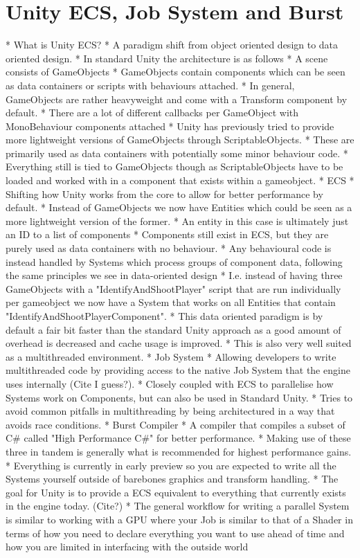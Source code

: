 \section{Unity ECS, Job System and Burst}
  * What is Unity ECS?	
	* A paradigm shift from object oriented design to data oriented design.
	* In standard Unity the architecture is as follows
		* A scene consists of GameObjects
		* GameObjects contain components which can be seen as data containers or scripts with behaviours attached.
	* In general, GameObjects are rather heavyweight and come with a Transform component by default.
		* There are a lot of different callbacks per GameObject with MonoBehaviour components attached
	* Unity has previously tried to provide more lightweight versions of GameObjects through ScriptableObjects.
		* These are primarily used as data containers with potentially some minor behaviour code.
        * Everything still is tied to GameObjects though as ScriptableObjects have to be loaded and worked with in a component that exists within a gameobject. 
    * ECS
    	* Shifting how Unity works from the core to allow for better performance by default.
    	* Instead of GameObjects we now have Entities which could be seen as a more lightweight version of the former. 
    	   * An entity in this case is ultimately just an ID to a list of components
    	* Components still exist in ECS, but they are purely used as data containers with no behaviour.
    	* Any behavioural code is instead handled by Systems which process groups of component data, following the same principles we see in data-oriented design
    		* I.e. instead of having three GameObjects with a "IdentifyAndShootPlayer" script that are run individually per gameobject we now have a System that works on all Entities that contain "IdentifyAndShootPlayerComponent".
    	* This data oriented paradigm is by default a fair bit faster than the standard Unity approach as a good amount of overhead is decreased and cache usage is improved.
        * This is also very well suited as a multithreaded environment.
    * Job System
      * Allowing developers to write multithreaded code by providing access to the native Job System that the engine uses internally (Cite I guess?).
	  * Closely coupled with ECS to parallelise how Systems work on Components, but can also be used in Standard Unity. 
      * Tries to avoid common pitfalls in multithreading by being architectured in a way that avoids race conditions.
    * Burst Compiler
      * A compiler that compiles a subset of C\# called "High Performance C\#" for better performance. 
    * Making use of these three in tandem is generally what is recommended for highest performance gains. 
    * Everything is currently in early preview so you are expected to write all the Systems yourself outside of barebones graphics and transform handling. 
	* The goal for Unity is to provide a ECS equivalent to everything that currently exists in the engine today. (Cite?) 
	* The general workflow for writing a parallel System is similar to working with a GPU where your Job is similar to that of a Shader in terms of how you need to declare everything you want to use ahead of time and how you are limited in interfacing with the outside world


